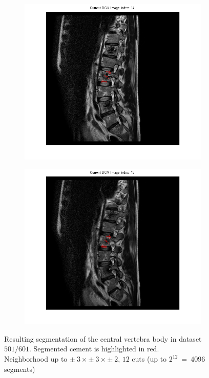 \documentclass{article}
\begin{document}
{\begin{figure}[h]
\begin{subfigure}[t]{0.15\linewidth}
      \end{subfigure}
      \hfill\begin{subfigure}[t]{0.15\linewidth}
        \centering
        \includegraphics[width=\linewidth,trim={6cm 3cm 6cm 0},clip]{imgs/mask14}
      \end{subfigure}
      \hfill
      \begin{subfigure}[t]{0.15\linewidth}
        \centering
        \includegraphics[width=\linewidth,trim={6cm 3cm 6cm 0},clip]{imgs/mask15}
      \end{subfigure}
      
      \caption{\label{fig:mask}
      Resulting segmentation of the central vertebra body in dataset $501/601$. Segmented cement is highlighted in red.\\
      Neighborhood up to $\pm~3 \times \pm~3 \times \pm~2$, $12$ cuts (up to $2^{12}~=~4096$ segments)}
    \end{figure}
  }
  
\end{document}
